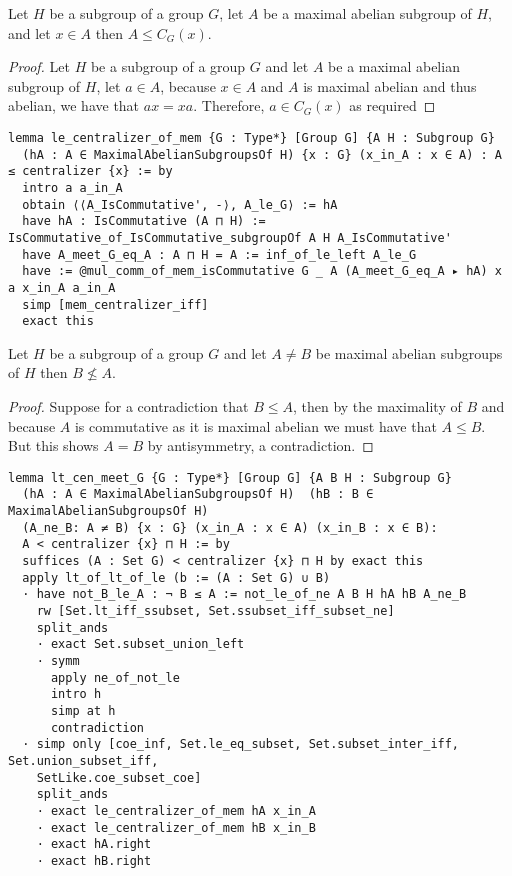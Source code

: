 \begin{lemma}
\label{MaximalAbelianSubgroup.le_centralizer_of_mem}
\leanok
Let $H$ be a subgroup of a group $G$, let $A$ be a maximal abelian subgroup of $H$, and let $x \in A$ then $A \le C_G(x)$.
\end{lemma}
\begin{proof}
  \leanok
  Let $H$ be a subgroup of a group $G$ and let $A$ be a maximal abelian subgroup of $H$, let $a \in A$,
  because $x \in A$ and $A$ is maximal abelian and thus abelian, we have that $a x = x a$. 
  Therefore, $a \in C_G(x)$ as required
\end{proof}
\begin{footnotesize}
\begin{verbatim}
lemma le_centralizer_of_mem {G : Type*} [Group G] {A H : Subgroup G}
  (hA : A ∈ MaximalAbelianSubgroupsOf H) {x : G} (x_in_A : x ∈ A) : A ≤ centralizer {x} := by
  intro a a_in_A
  obtain ⟨⟨A_IsCommutative', -⟩, A_le_G⟩ := hA
  have hA : IsCommutative (A ⊓ H) := IsCommutative_of_IsCommutative_subgroupOf A H A_IsCommutative'
  have A_meet_G_eq_A : A ⊓ H = A := inf_of_le_left A_le_G
  have := @mul_comm_of_mem_isCommutative G _ A (A_meet_G_eq_A ▸ hA) x a x_in_A a_in_A
  simp [mem_centralizer_iff]
  exact this
\end{verbatim}
\end{footnotesize}

\begin{lemma}
  \label{MaximalAbelianSubgroup.not_le_of_ne}
  \leanok
  Let $H$ be a subgroup of a group $G$ and let $A \ne B$ be maximal abelian subgroups of $H$ then $B \not\le A$.
\end{lemma}
\begin{proof}
  \leanok
Suppose for a contradiction that $B \le A$, then by the maximality of $B$ and because $A$ is commutative as it is maximal abelian we must have that $A \le B$.
But this shows $A = B$ by antisymmetry, a contradiction.
\end{proof}
\begin{footnotesize}
\begin{verbatim}
lemma lt_cen_meet_G {G : Type*} [Group G] {A B H : Subgroup G}
  (hA : A ∈ MaximalAbelianSubgroupsOf H)  (hB : B ∈ MaximalAbelianSubgroupsOf H)
  (A_ne_B: A ≠ B) {x : G} (x_in_A : x ∈ A) (x_in_B : x ∈ B):
  A < centralizer {x} ⊓ H := by
  suffices (A : Set G) < centralizer {x} ⊓ H by exact this
  apply lt_of_lt_of_le (b := (A : Set G) ∪ B)
  · have not_B_le_A : ¬ B ≤ A := not_le_of_ne A B H hA hB A_ne_B
    rw [Set.lt_iff_ssubset, Set.ssubset_iff_subset_ne]
    split_ands
    · exact Set.subset_union_left
    · symm
      apply ne_of_not_le
      intro h
      simp at h
      contradiction
  · simp only [coe_inf, Set.le_eq_subset, Set.subset_inter_iff, Set.union_subset_iff,
    SetLike.coe_subset_coe]
    split_ands
    · exact le_centralizer_of_mem hA x_in_A
    · exact le_centralizer_of_mem hB x_in_B
    · exact hA.right
    · exact hB.right
\end{verbatim}
\end{footnotesize}

